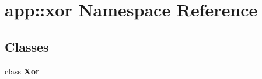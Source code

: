 \section{app::xor Namespace Reference}
\label{namespaceapp_1_1xor}


\subsection*{Classes}
\begin{CompactItemize}
\item 
class {\bf Xor}
\end{CompactItemize}
